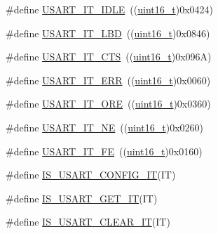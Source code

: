 \begin{DoxyCompactItemize}
\item 
\#define \hyperlink{group___u_s_a_r_t___interrupt__definition_ga5d85aab24b7b2dfddb61ba2a49fa6185}{U\+S\+A\+R\+T\+\_\+\+I\+T\+\_\+\+I\+D\+LE}~((\hyperlink{_p_e___types_8h_a1f1825b69244eb3ad2c7165ddc99c956}{uint16\+\_\+t})0x0424)
\item 
\#define \hyperlink{group___u_s_a_r_t___interrupt__definition_ga063628e16cdda199b07d380421afc4a5}{U\+S\+A\+R\+T\+\_\+\+I\+T\+\_\+\+L\+BD}~((\hyperlink{_p_e___types_8h_a1f1825b69244eb3ad2c7165ddc99c956}{uint16\+\_\+t})0x0846)
\item 
\#define \hyperlink{group___u_s_a_r_t___interrupt__definition_gab49efbefaca2921e8cbe8f5146e99dbd}{U\+S\+A\+R\+T\+\_\+\+I\+T\+\_\+\+C\+TS}~((\hyperlink{_p_e___types_8h_a1f1825b69244eb3ad2c7165ddc99c956}{uint16\+\_\+t})0x096\+A)
\item 
\#define \hyperlink{group___u_s_a_r_t___interrupt__definition_ga631e83efd4c4789128d80a9539faf78a}{U\+S\+A\+R\+T\+\_\+\+I\+T\+\_\+\+E\+RR}~((\hyperlink{_p_e___types_8h_a1f1825b69244eb3ad2c7165ddc99c956}{uint16\+\_\+t})0x0060)
\item 
\#define \hyperlink{group___u_s_a_r_t___interrupt__definition_ga8b7d40e02a81be787fbb325bbe6dfbeb}{U\+S\+A\+R\+T\+\_\+\+I\+T\+\_\+\+O\+RE}~((\hyperlink{_p_e___types_8h_a1f1825b69244eb3ad2c7165ddc99c956}{uint16\+\_\+t})0x0360)
\item 
\#define \hyperlink{group___u_s_a_r_t___interrupt__definition_gad5de042f579b50f1e8643009176486b3}{U\+S\+A\+R\+T\+\_\+\+I\+T\+\_\+\+NE}~((\hyperlink{_p_e___types_8h_a1f1825b69244eb3ad2c7165ddc99c956}{uint16\+\_\+t})0x0260)
\item 
\#define \hyperlink{group___u_s_a_r_t___interrupt__definition_ga9af8790f78f6cb1591506c57d0cc0fb3}{U\+S\+A\+R\+T\+\_\+\+I\+T\+\_\+\+FE}~((\hyperlink{_p_e___types_8h_a1f1825b69244eb3ad2c7165ddc99c956}{uint16\+\_\+t})0x0160)
\item 
\#define \hyperlink{group___u_s_a_r_t___interrupt__definition_ga37ce140eae1938a414ff32afed5ef236}{I\+S\+\_\+\+U\+S\+A\+R\+T\+\_\+\+C\+O\+N\+F\+I\+G\+\_\+\+IT}(IT)
\item 
\#define \hyperlink{group___u_s_a_r_t___interrupt__definition_ga9a8014793a383d710eaaf4185f2b795d}{I\+S\+\_\+\+U\+S\+A\+R\+T\+\_\+\+G\+E\+T\+\_\+\+IT}(IT)
\item 
\#define \hyperlink{group___u_s_a_r_t___interrupt__definition_ga3ceda175140b84eea02a2261ebda4efd}{I\+S\+\_\+\+U\+S\+A\+R\+T\+\_\+\+C\+L\+E\+A\+R\+\_\+\+IT}(IT)
\end{DoxyCompactItemize}


